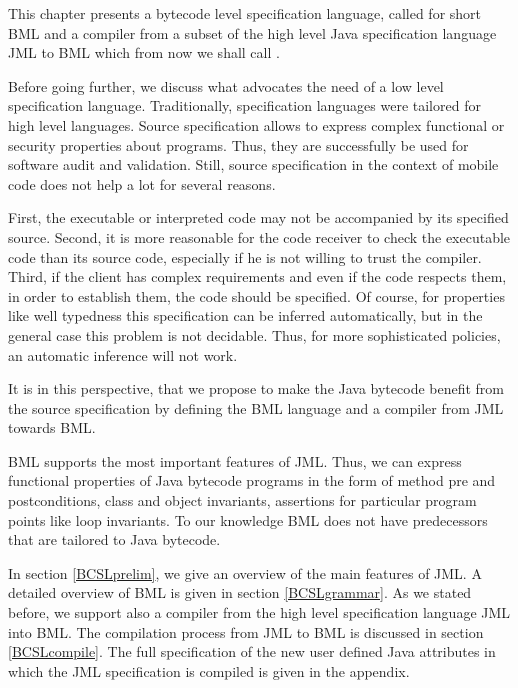 
%

\newcommand{\code}{\textit{code}}
\newcommand{\indexComp}{\textit{index}}





This chapter presents a bytecode level specification language, called for short BML and a compiler from a
 subset of the high level Java specification language JML to BML which from now we shall call \JMLtoBML. 


 Before going further, we discuss what advocates the need of a low level specification language.
Traditionally, specification languages were tailored for high level languages.  
Source  specification allows to express complex functional or security properties about programs.
Thus, they are successfully be used 
for software audit and validation. Still, source specification in the context of mobile code does not help a lot for several reasons.


First, the executable or interpreted code  may not be accompanied by its specified  source. Second, it is more reasonable for the 
code receiver to check the executable code than its source code, especially if he is not willing to trust the compiler. 
Third, if the client has complex requirements and even if the code respects them, in order to establish them, 
the code should be specified. Of course, for properties like well typedness this specification can be inferred automatically,
but in the general case this problem is not decidable. 
Thus, for more sophisticated policies, an automatic inference will not work.

 It is in this perspective, that we propose to make the Java
bytecode benefit from the source specification by defining the BML language and a compiler from JML towards BML.    

 BML supports the most important features of JML. Thus, we can express functional properties of Java
 bytecode programs in the form of method pre and postconditions, class and object invariants, assertions
 for particular program points like loop invariants. To our knowledge BML does not have predecessors that are tailored 
 to Java bytecode.  

 In section \ref{BCSLprelim}, we give an overview of the main features of JML. A detailed overview of BML is given in section \ref{BCSLgrammar}.  
  As we stated before, we support also a compiler from the high level specification language JML into BML. The 
 compilation process from JML to BML is discussed in section  \ref{BCSLcompile}.
 The full specification of the new user defined Java attributes in which the JML specification is compiled is given in the appendix.




